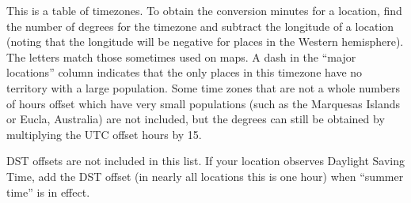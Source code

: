 This is a table of timezones. To obtain the conversion minutes for a location, find the number of degrees for the timezone and subtract the longitude of a location (noting that the longitude will be negative for places in the Western hemisphere). The letters match those sometimes used on maps. A dash in the “major locations” column indicates that the only places in this timezone have no territory with a large population. Some time zones that are not a whole numbers of hours offset which have very small populations (such as the Marquesas Islands or Eucla, Australia) are not included, but the degrees can still be obtained by multiplying the UTC offset hours by 15.

DST offsets are not included in this list.  If your location observes Daylight Saving Time, add the DST offset (in nearly all locations this is one hour) when “summer time” is in effect.

